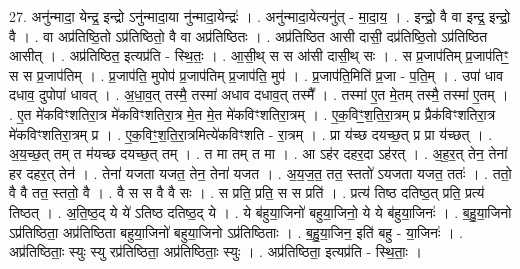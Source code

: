 \documentclass[17pt]{extarticle}
\begin{document}
27. अनु॑न्मादा॒ येन्द्र॒ इन्द्रो ऽनु॑न्मादा॒या नु॑न्मादा॒येन्द्रः॑ । . अनु॑न्मादा॒येत्यनु॑त् - मा॒दा॒य॒ । . इन्द्रो॒ वै वा इन्द्र॒ इन्द्रो॒ वै । . वा अप्र॑तिष्ठि॒तो ऽप्र॑तिष्ठितो॒ वै वा अप्र॑तिष्ठितः । . अप्र॑तिष्ठित आसी दासी॒ दप्र॑तिष्ठि॒तो ऽप्र॑तिष्ठित आसीत् । . अप्र॑तिष्ठित॒ इत्यप्र॑ति - स्थि॒तः॒ । . आ॒सी॒थ् स स आ॑सी दासी॒थ् सः । . स प्र॒जाप॑तिम् प्र॒जाप॑तिꣳ॒॒ स स प्र॒जाप॑तिम् । . प्र॒जाप॑ति॒ मुपोप॑ प्र॒जाप॑तिम् प्र॒जाप॑ति॒ मुप॑ । . प्र॒जाप॑ति॒मिति॑ प्र॒जा - प॒ति॒म् । . उपा॑ धाव दधाव॒ दुपोपा॑ धावत् । . अ॒धा॒व॒त् तस्मै॒ तस्मा॑ अधाव दधाव॒त् तस्मै᳚ । . तस्मा॑ ए॒त मे॒तम् तस्मै॒ तस्मा॑ ए॒तम् । . ए॒त मे॑कविꣳशतिरा॒त्र मे॑कविꣳशतिरा॒त्र मे॒त मे॒त मे॑कविꣳशतिरा॒त्रम् । . ए॒क॒विꣳ॒॒श॒ति॒रा॒त्रम् प्र प्रैक॑विꣳशतिरा॒त्र मे॑कविꣳशतिरा॒त्रम् प्र । . ए॒क॒विꣳ॒॒श॒ति॒रा॒त्रमित्ये॑कविꣳशति - रा॒त्रम् । . प्रा य॑च्छ दयच्छ॒त् प्र प्रा य॑च्छत् । . अ॒य॒च्छ॒त् तम् त म॑यच्छ दयच्छ॒त् तम् । . त मा तम् त मा । . आ ऽह॑र दहर॒दा ऽह॑रत् । . अ॒ह॒र॒त् तेन॒ तेना॑ हर दहर॒त् तेन॑ । . तेना॑ यजता यजत॒ तेन॒ तेना॑ यजत । . अ॒य॒ज॒त॒ तत॒ स्ततो॑ ऽयजता यजत॒ ततः॑ । . ततो॒ वै वै तत॒ स्ततो॒ वै । . वै स स वै वै सः । . स प्रति॒ प्रति॒ स स प्रति॑ । . प्रत्य॑ तिष्ठ दतिष्ठ॒त् प्रति॒ प्रत्य॑ तिष्ठत् । . अ॒ति॒ष्ठ॒द् ये ये॑ ऽतिष्ठ दतिष्ठ॒द् ये । . ये ब॑हुया॒जिनो॑ बहुया॒जिनो॒ ये ये ब॑हुया॒जिनः॑ । . ब॒हु॒या॒जिनो ऽप्र॑तिष्ठिता॒ अप्र॑तिष्ठिता बहुया॒जिनो॑ बहुया॒जिनो ऽप्र॑तिष्ठिताः । . ब॒हु॒या॒जिन॒ इति॑ बहु - या॒जिनः॑ । . अप्र॑तिष्ठिताः॒ स्युः स्यु रप्र॑तिष्ठिता॒ अप्र॑तिष्ठिताः॒ स्युः । . अप्र॑तिष्ठिता॒ इत्यप्र॑ति - स्थि॒ताः॒ । \newline
\end{document}
